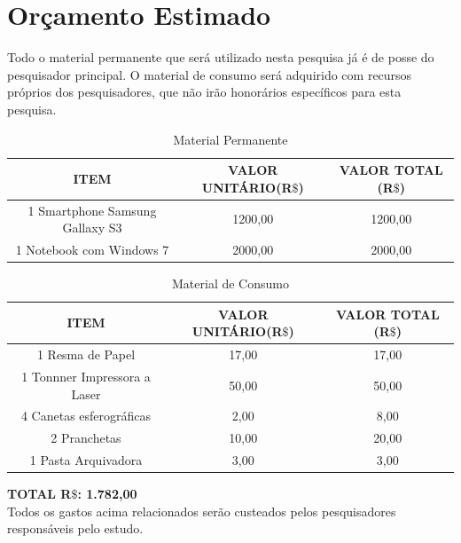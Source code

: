 \section{Orçamento Estimado} 
Todo o material permanente que será utilizado nesta pesquisa já é de posse do pesquisador principal. O material de consumo será adquirido com recursos próprios dos pesquisadores, que não irão honorários específicos para esta pesquisa.

\begin{table}
	\centering
	\begin{tabular}{|c|c|c|}
		\hline \textbf{ITEM} & \textbf{VALOR UNITÁRIO(R$\$$)} & \textbf{VALOR TOTAL (R$\$$)}\\ 
		\hline 1 Smartphone Samsung Gallaxy S3 & 1200,00 & 1200,00 \\ 
		\hline 1 Notebook com Windows 7 & 2000,00 & 2000,00 \\ 
		\hline 
	\end{tabular} 
	\label{material_permanente}
	\caption{Material Permanente}
\end{table}


\begin{table}
	\centering
	\begin{tabular}{|c|c|c|}
		\hline \textbf{ITEM} & \textbf{VALOR UNITÁRIO(R$\$$)} & \textbf{VALOR TOTAL (R$\$$)}\\ 
		\hline 1 Resma de Papel & 17,00 & 17,00 \\ 
		\hline 1 Tonnner Impressora a Laser & 50,00 & 50,00 \\ 
		\hline 4 Canetas esferográficas & 2,00 & 8,00 \\
		\hline 2 Pranchetas & 10,00 & 20,00 \\
		\hline 1 Pasta Arquivadora & 3,00 & 3,00 \\
		\hline 
	\end{tabular} 
	\label{material_permanente}
	\caption{Material de Consumo}
\end{table}

\textbf{TOTAL R$\$$: 1.782,00} \\
Todos os gastos acima relacionados serão custeados pelos pesquisadores responsáveis pelo estudo.

